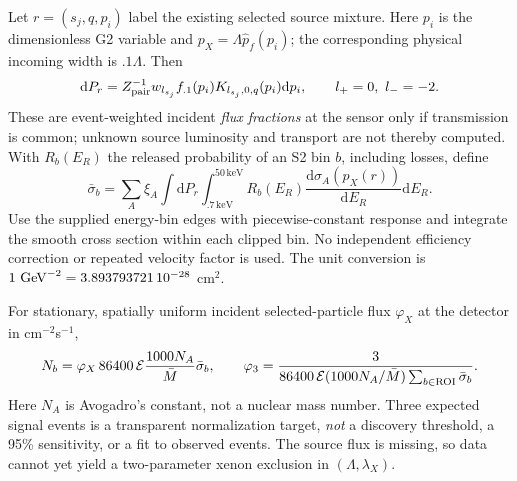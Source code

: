 \documentclass[11pt,a4paper]{article}
\newcommand{\dd}{\mathrm d}
\begin{document}
Let $r=(s_j,q,p_i)$ label the existing selected source mixture. Here
$p_i$ is the dimensionless G2 variable and $p_X=\Lambda\hat p_f(p_i)$;
the corresponding physical incoming width is $.1\Lambda$. Then
\begin{equation}
 \dd P_r=Z_{\rm pair}^{-1}w_{l_{s_j}}f_{.1}(p_i)
 K_{l_{s_j},0,q}(p_i)\dd p_i,\qquad l_+=0,\ l_-=-2.
\end{equation}
These are event-weighted incident \emph{flux fractions} at the sensor
only if transmission is common; unknown source luminosity and transport
are not thereby computed. With $R_b(E_R)$ the released probability
of an S2 bin $b$, including losses, define
\begin{equation}
 \bar\sigma_b=\sum_A\xi_A\int\dd P_r
 \int_{.7\,\mathrm{keV}}^{50\,\mathrm{keV}}
 R_b(E_R)\frac{\dd\sigma_A(p_X(r))}{\dd E_R}\dd E_R.
\end{equation}
Use the supplied energy-bin edges with piecewise-constant response and
integrate the smooth cross section within each clipped bin. No
independent efficiency correction or repeated velocity factor is used.
The unit conversion is $1\ {\rm GeV}^{-2}=3.893793721\,10^{-28}$ cm$^2$.

For stationary, spatially uniform incident selected-particle flux
$\varphi_X$ at the detector in cm$^{-2}$s$^{-1}$,
\begin{equation}\label{eq:flux}
 N_b=\varphi_X\,86400\,{\cal E}\frac{1000N_A}{\bar M}\bar\sigma_b,
 \qquad
 \varphi_3=\frac3{86400\,{\cal E}(1000N_A/\bar M)
                      \sum_{b\in\mathrm{ROI}}\bar\sigma_b}.
\end{equation}
Here $N_A$ is Avogadro's constant, not a nuclear mass number.
Three expected signal events is a transparent normalization target,
\emph{not} a discovery threshold, a 95\% sensitivity, or a fit to
observed events. The source flux is missing, so data cannot yet yield
a two-parameter xenon exclusion in $(\Lambda,\lambda_X)$.
\end{document}
